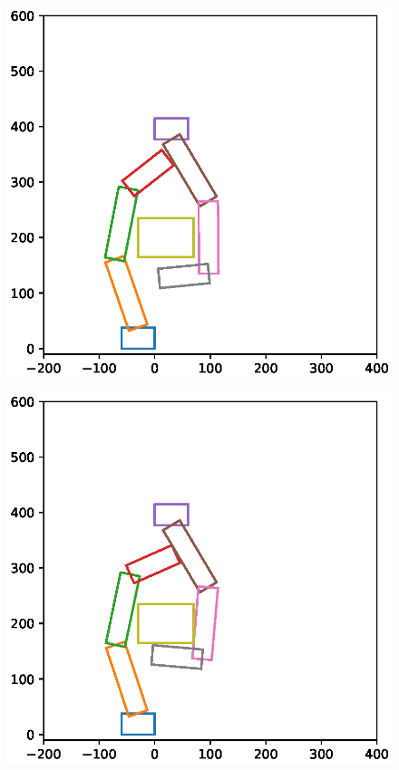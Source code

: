 \documentclass[a4paper,twoside,12pt,papersize, dvipdfmx]{iirthesis}
\begin{document}
\begin{figure}[b]
\centering
\includegraphics[width=0.5\hsize]{fig/3-new-planner/before_FC.eps}
\label{fig::planner::beforefc}

\begin{minipage}{0.49\hsize}
\includegraphics[width=0.99\hsize]{fig/3-new-planner/FC_leftright.eps}
\label{fig::planner::afterfclr}
\end{minipage}\hfill
\begin{minipage}{0.49\hsize}

\end{minipage}
\end{figure}
\end{document}
